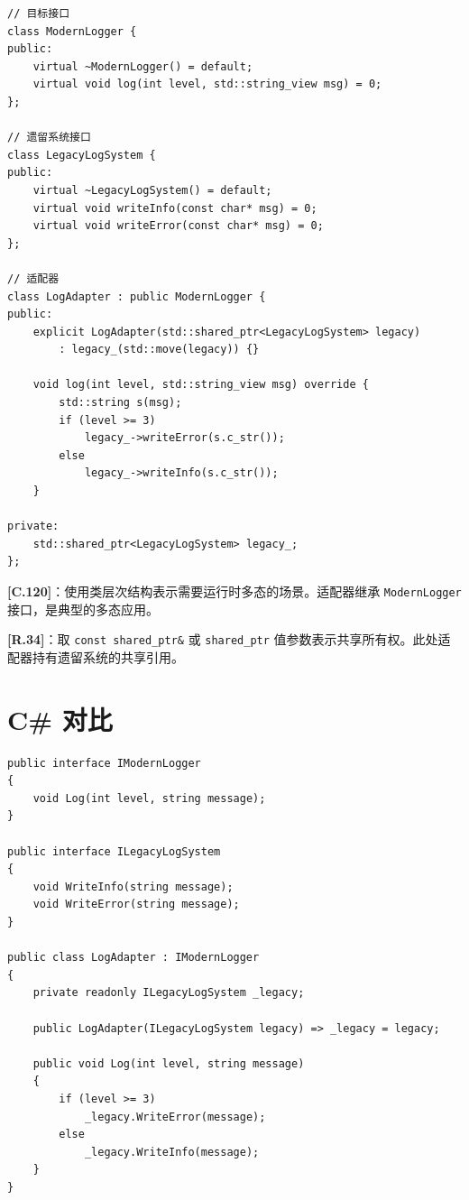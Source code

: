 \documentclass[12pt,a4paper,fontset=fandol]{ctexbook}
\newcommand{\guideref}[1]{\textbf{\textcolor{blue!70!black}{[#1]}}}
\begin{document}
\begin{lstlisting}[style=cppstyle, caption={适配器模式 --- C++ 实现}]
// 目标接口
class ModernLogger {
public:
    virtual ~ModernLogger() = default;
    virtual void log(int level, std::string_view msg) = 0;
};

// 遗留系统接口
class LegacyLogSystem {
public:
    virtual ~LegacyLogSystem() = default;
    virtual void writeInfo(const char* msg) = 0;
    virtual void writeError(const char* msg) = 0;
};

// 适配器
class LogAdapter : public ModernLogger {
public:
    explicit LogAdapter(std::shared_ptr<LegacyLogSystem> legacy)
        : legacy_(std::move(legacy)) {}

    void log(int level, std::string_view msg) override {
        std::string s(msg);
        if (level >= 3)
            legacy_->writeError(s.c_str());
        else
            legacy_->writeInfo(s.c_str());
    }

private:
    std::shared_ptr<LegacyLogSystem> legacy_;
};
\end{lstlisting}

\begin{guideline}
\guideref{C.120}：使用类层次结构表示需要运行时多态的场景。适配器继承 \texttt{ModernLogger} 接口，是典型的多态应用。

\guideref{R.34}：取 \texttt{const shared\_ptr\&} 或 \texttt{shared\_ptr} 值参数表示共享所有权。此处适配器持有遗留系统的共享引用。
\end{guideline}

\section{C\# 对比}

\begin{lstlisting}[style=csharpstyle, caption={适配器模式 --- C\# 实现}]
public interface IModernLogger
{
    void Log(int level, string message);
}

public interface ILegacyLogSystem
{
    void WriteInfo(string message);
    void WriteError(string message);
}

public class LogAdapter : IModernLogger
{
    private readonly ILegacyLogSystem _legacy;

    public LogAdapter(ILegacyLogSystem legacy) => _legacy = legacy;

    public void Log(int level, string message)
    {
        if (level >= 3)
            _legacy.WriteError(message);
        else
            _legacy.WriteInfo(message);
    }
}
\end{lstlisting}
\end{document}
